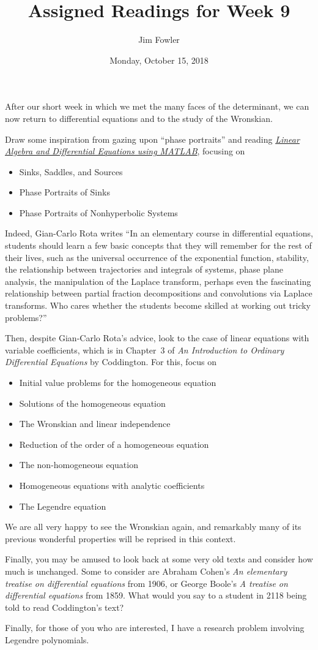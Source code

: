 \documentclass{homework}
\author{Jim Fowler}
\title{Assigned Readings for Week 9}
\date{Monday, October 15, 2018}
\begin{document}
\maketitle

After our short week in which we met the many faces of the
determinant, we can now return to differential equations and to the
study of the Wronskian.

Draw some inspiration from gazing upon ``phase portraits'' and reading
\textit{\href{/courses/43735/files/folder/textbooks}{Linear Algebra
    and Differential Equations using MATLAB}}, focusing on
\begin{itemize}
\item {} Sinks, Saddles, and Sources
\item {} Phase Portraits of Sinks
\item {} Phase Portraits of Nonhyperbolic Systems
\end{itemize}
Indeed, Gian-Carlo Rota writes ``In an elementary course in
differential equations, students should learn a few basic concepts
that they will remember for the rest of their lives, such as the
universal occurrence of the exponential function, stability, the
relationship between trajectories and integrals of systems, phase
plane analysis, the manipulation of the Laplace transform, perhaps
even the fascinating relationship between partial fraction
decompositions and convolutions via Laplace transforms.  Who cares
whether the students become skilled at working out tricky problems?''

Then, despite Gian-Carlo Rota's advice, look to the case of linear
equations with variable coefficients, which is in Chapter~3 of
\textit{An Introduction to Ordinary Differential Equations} by
Coddington.  For this, focus on
\begin{itemize}
\item {} Initial value problems for the homogeneous equation
\item {} Solutions of the homogeneous equation %
\item {} The Wronskian and linear independence %
\item {} Reduction of the order of a homogeneous equation %
\item {} The non-homogeneous equation %
\item {} Homogeneous equations with analytic coefficients %
\item {} The Legendre equation %
\end{itemize}
We are all very happy to see the Wronskian again, and remarkably many
of its previous wonderful properties will be reprised in this context.

Finally, you may be amused to look back at some very old texts and
consider how much is unchanged.  Some to consider are Abraham Cohen's
\textit{An elementary treatise on differential equations} from 1906,
or George Boole's \textit{A treatise on differential equations} from
1859.  What would you say to a student in 2118 being told to read
Coddington's text?

Finally, for those of you who are interested, I have a research
problem involving Legendre polynomials.
\end{document}
